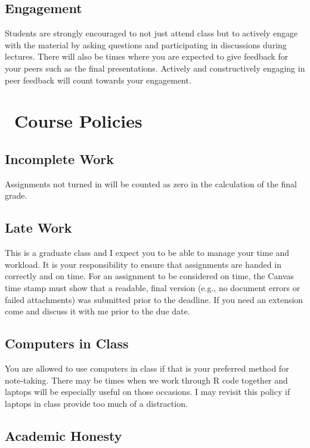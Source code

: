 \documentclass[11pt,letterpaper]{article}
\begin{document}
\subsection*{Engagement}

Students are strongly encouraged to not just attend class but to actively engage with the material by asking questions and participating in discussions during lectures. There will also be times where you are expected to give feedback for your peers such as the final presentations. Actively and constructively engaging in peer feedback will count towards your engagement.

\section*{\faExclamationTriangle\ Course Policies}

\subsection*{Incomplete Work}

Assignments not turned in will be counted as zero in the calculation of the final grade.

\subsection*{Late Work}

This is a graduate class and I expect you to be able to manage your time and workload. It is your responsibility to ensure that assignments are handed in correctly and on time. For an assignment to be considered on time, the Canvas time stamp must show that a readable, final version (e.g., no document errors or failed attachments) was submitted prior to the deadline. If you need an extension come and discuss it with me prior to the due date.

\subsection*{Computers in Class}

You are allowed to use computers in class if that is your preferred method for note-taking. There may be times when we work through R code together and laptops will be especially useful on those occasions. I may revisit this policy if laptops in class provide too much of a distraction.

\subsection*{Academic Honesty}
\end{document}
